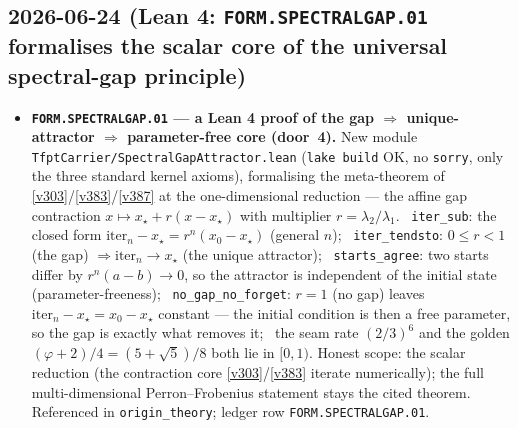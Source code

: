 \subsection*{2026-06-24 (Lean 4: \texttt{FORM.SPECTRALGAP.01} formalises the scalar core of the universal spectral-gap principle)}
\begin{itemize}
\item \textbf{\texttt{FORM.SPECTRALGAP.01} --- a Lean 4 proof of the gap $\Rightarrow$ unique-attractor $\Rightarrow$
parameter-free core (door~4).} New module \texttt{TfptCarrier/SpectralGapAttractor.lean} (\texttt{lake build} OK,
no \texttt{sorry}, only the three standard kernel axioms), formalising the meta-theorem of \vref{v303}/\vref{v383}/\vref{v387}
at the one-dimensional reduction --- the affine gap contraction $x\mapsto x_\star+r(x-x_\star)$ with multiplier
$r=\lambda_2/\lambda_1$. \mE\ \texttt{iter\_sub}: the closed form $\mathrm{iter}_n-x_\star=r^n(x_0-x_\star)$ (general $n$);
\mE\ \texttt{iter\_tendsto}: $0\le r<1$ (the gap) $\Rightarrow\mathrm{iter}_n\to x_\star$ (the unique attractor);
\mE\ \texttt{starts\_agree}: two starts differ by $r^n(a-b)\to0$, so the attractor is independent of the initial state
(parameter-freeness); \mE\ \texttt{no\_gap\_no\_forget}: $r=1$ (no gap) leaves $\mathrm{iter}_n-x_\star=x_0-x_\star$ constant
--- the initial condition is then a free parameter, so the gap is exactly what removes it; \mE\ the seam rate $(2/3)^6$ and
the golden $(\varphi+2)/4=(5+\sqrt5)/8$ both lie in $[0,1)$. Honest scope: the scalar reduction (the contraction core
\vref{v303}/\vref{v383} iterate numerically); the full multi-dimensional Perron--Frobenius statement stays the cited theorem.
Referenced in \texttt{origin\_theory}; ledger row \texttt{FORM.SPECTRALGAP.01}.
\end{itemize}

